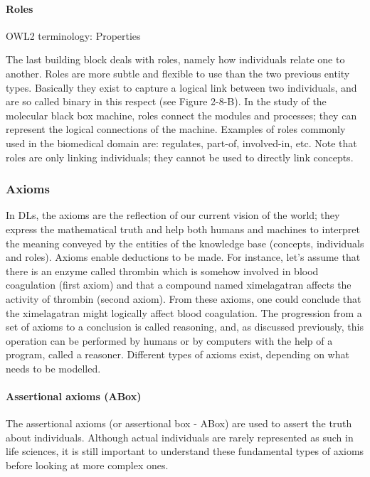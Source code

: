 \paragraph{\textbf{Roles}\\}

OWL2 terminology: Properties

The last building block deals with roles, namely how individuals relate one to another. Roles are more subtle and flexible to use than the two previous entity types. Basically they exist to capture a logical link between two individuals, and are so called binary in this respect (see Figure 2-8-B). In the study of the molecular black box machine, roles connect the modules and processes; they can represent the logical connections of the machine. Examples of roles commonly used in the biomedical domain are: regulates, part-of, involved-in, etc. Note that roles are only linking individuals; they cannot be used to directly link concepts.

\subsubsection{Axioms}

In DLs, the axioms are the reflection of our current vision of the world; they express the mathematical truth and help both humans and machines to interpret the meaning conveyed by the entities of the knowledge base (concepts, individuals and roles). Axioms enable deductions to be made. For instance, let’s assume that there is an enzyme called thrombin which is somehow involved in blood coagulation (first axiom) and that a compound named ximelagatran affects the activity of thrombin (second axiom). From these axioms, one could conclude that the ximelagatran might logically affect blood coagulation. The progression from a set of axioms to a conclusion is called reasoning, and, as discussed previously, this operation can be performed by humans or by computers with the help of a program, called a reasoner. Different types of axioms exist, depending on what needs to be modelled.

\paragraph{\textbf{Assertional axioms (ABox)}\\}
The assertional axioms (or assertional box - ABox) are used to assert the truth about individuals. Although actual individuals are rarely represented as such in life sciences, it is still important to understand these fundamental types of axioms before looking at more complex ones.

